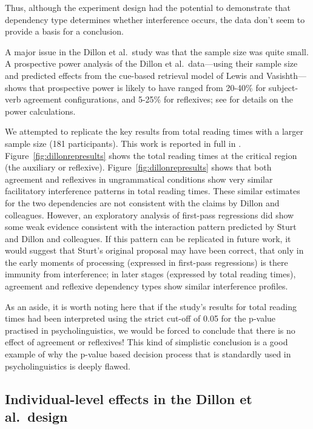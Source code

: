 \documentclass{cambridge7A}\usepackage[]{graphicx}\usepackage[]{color}
\begin{document}
Thus, although the experiment design had the potential to demonstrate that dependency type determines whether interference occurs, the data don't seem to provide a basis for a conclusion. 

A major issue in the Dillon et al.\ study was that the sample size was quite small. A prospective power analysis of the Dillon et al.\ data---using their sample size and predicted effects from the cue-based retrieval model of Lewis and Vasishth---shows that prospective power is likely to have ranged from 20-40\% for subject-verb agreement configurations, and 5-25\% for reflexives; see \cite{JaegerMertzenVanDykeVasishth2019} for details on the power calculations.   

We attempted to replicate the key results from total reading times with a larger sample size (181 participants). This work is reported in full in \cite{JaegerMertzenVanDykeVasishth2019}.
Figure~\ref{fig:dillonrepresults} shows the total reading times at the critical region (the auxiliary or reflexive). Figure~\ref{fig:dillonrepresults} shows that both agreement and reflexives in ungrammatical conditions show very similar  facilitatory interference patterns in total reading times. These similar estimates for the two dependencies are not consistent with the claims by Dillon and colleagues. However, an exploratory analysis of first-pass regressions did show some weak evidence consistent with the interaction pattern predicted by Sturt and Dillon and colleagues. If this pattern can be replicated in future work, it would suggest that Sturt's original proposal may have been correct, that only in the early moments of processing (expressed in first-pass regressions) is there immunity from interference; in later stages (expressed by total reading times), agreement and reflexive dependency types show similar interference profiles.

As an aside, it is worth noting here that if the \cite{JaegerMertzenVanDykeVasishth2019} study's results for total reading times had been interpreted using the strict cut-off of 0.05 for the p-value practised in psycholinguistics, we would be forced to conclude that there is no effect of agreement or reflexives! This kind of simplistic conclusion is a good example of why the p-value based decision process that is standardly used in psycholinguistics is deeply flawed. 

\subsection{Individual-level effects in the Dillon et al.\ design}
\end{document}
